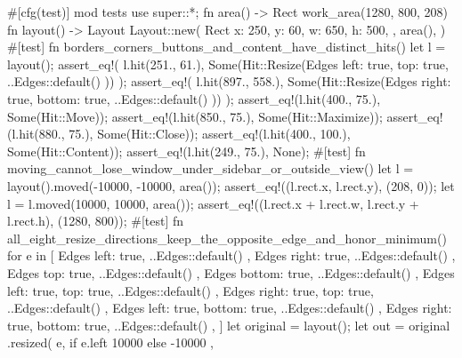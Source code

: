 #[cfg(test)]
mod tests {
    use super::*;
    fn area() -> Rect {
        work_area(1280, 800, 208)
    }
    fn layout() -> Layout {
        Layout::new(
            Rect {
                x: 250,
                y: 60,
                w: 650,
                h: 500,
            },
            area(),
        )
    }
    #[test]
    fn borders_corners_buttons_and_content_have_distinct_hits() {
        let l = layout();
        assert_eq!(
            l.hit(251., 61.),
            Some(Hit::Resize(Edges {
                left: true,
                top: true,
                ..Edges::default()
            }))
        );
        assert_eq!(
            l.hit(897., 558.),
            Some(Hit::Resize(Edges {
                right: true,
                bottom: true,
                ..Edges::default()
            }))
        );
        assert_eq!(l.hit(400., 75.), Some(Hit::Move));
        assert_eq!(l.hit(850., 75.), Some(Hit::Maximize));
        assert_eq!(l.hit(880., 75.), Some(Hit::Close));
        assert_eq!(l.hit(400., 100.), Some(Hit::Content));
        assert_eq!(l.hit(249., 75.), None);
    }
    #[test]
    fn moving_cannot_lose_window_under_sidebar_or_outside_view() {
        let l = layout().moved(-10000, -10000, area());
        assert_eq!((l.rect.x, l.rect.y), (208, 0));
        let l = l.moved(10000, 10000, area());
        assert_eq!((l.rect.x + l.rect.w, l.rect.y + l.rect.h), (1280, 800));
    }
    #[test]
    fn all_eight_resize_directions_keep_the_opposite_edge_and_honor_minimum() {
        for e in [
            Edges {
                left: true,
                ..Edges::default()
            },
            Edges {
                right: true,
                ..Edges::default()
            },
            Edges {
                top: true,
                ..Edges::default()
            },
            Edges {
                bottom: true,
                ..Edges::default()
            },
            Edges {
                left: true,
                top: true,
                ..Edges::default()
            },
            Edges {
                right: true,
                top: true,
                ..Edges::default()
            },
            Edges {
                left: true,
                bottom: true,
                ..Edges::default()
            },
            Edges {
                right: true,
                bottom: true,
                ..Edges::default()
            },
        ] {
            let original = layout();
            let out = original
                .resized(
                    e,
                    if e.left { 10000 } else { -10000 },
}}}
